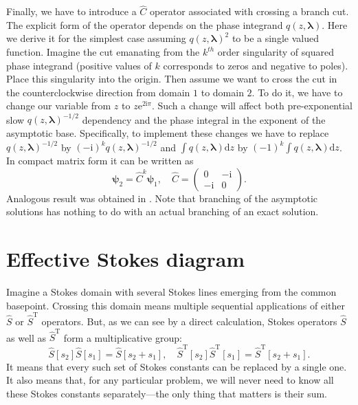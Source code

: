 \documentclass[atmp]{ipart_v1}
\def\rmd{\mathrm{d}}
\def\rme{\mathrm{e}}
\def\rmi{\mathrm{i}}
\def\S{\widehat{S}}
\def\C{\widehat{C}}
\def\psii{\bm\psi}
\def\lmbd{\bm{\lambda}}
\def\Tp{\mathrm{T}}
\newcommand\phsintgrnd[1][z]{q(#1,\lmbd)}
\newcommand\predexp[1][z]{q(#1,\lmbd)^{-1/2}}
\begin{document}
Finally, we have to introduce a $\C$ operator associated with crossing a branch cut. The explicit form 
of the operator depends on the phase integrand $\phsintgrnd$. Here we derive it for the simplest case  
assuming $\phsintgrnd^2$ to be a single valued function. Imagine the cut emanating from the $k^{th}$ order
singularity of squared phase integrand (positive values of $k$ corresponds to zeros and negative to poles). 
Place this singularity into the origin. Then assume we want to cross the cut in the counterclockwise  
direction from domain $1$ to domain $2$. To do it, we have to change our variable 
from $z$ to $z \rme^{2\rmi\pi}$. Such a change will affect both pre-exponential 
slow $\predexp$ dependency and the phase integral in the exponent of the asymptotic 
base. Specifically, to implement these changes we have to replace $\predexp$ by $(-\rmi)^k \predexp$ 
and $\int \phsintgrnd \rmd z$ by $(-1)^k \int \phsintgrnd \rmd z$. In compact matrix form 
it can be written as
\begin{equation}
\psii_2 = \C^k \psii_1, \quad
\C =  \left(\begin{array}{*{2}{c}} 0 & -\rmi \\ -\rmi & 0 \end{array}\right).    \label{eq:C}
\end{equation}
Analogous result was obtained in \cite{frbook}. Note that branching of the asymptotic solutions has nothing to do with an actual branching  of  an exact solution.

\section{Effective Stokes diagram \label{sec:effsd}}
Imagine a Stokes domain with several Stokes lines emerging from the common basepoint.
Crossing this domain means multiple sequential applications of either $\S$ or $\S^{\Tp}$ operators. But, as we
can see by a direct calculation, Stokes operators $\S$ as well as $\S^{\Tp}$ form a multiplicative
group:
\begin{equation}
\S[s_2]\S[s_1] = \S[s_2 + s_1], \quad
\S^{\Tp}[s_2]\S^{\Tp}[s_1] = \S^{\Tp}[s_2 + s_1].
\end{equation}
It means that every such set of Stokes constants can be replaced by a single one. It also means that,
for any particular problem, we will never need to know all these Stokes constants separately---the only
thing that matters is their sum.
\end{document}

